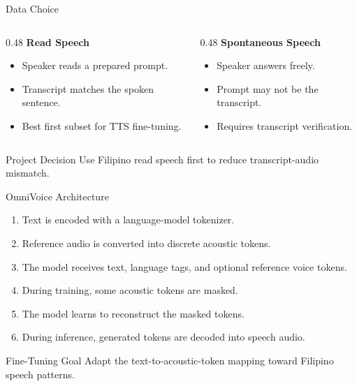 \documentclass[aspectratio=169]{beamer}
\begin{document}
\begin{frame}{Data Choice}
  \begin{columns}[T]
    \begin{column}{0.48\textwidth}
      \textbf{Read Speech}
      \begin{itemize}
        \item Speaker reads a prepared prompt.
        \item Transcript matches the spoken sentence.
        \item Best first subset for TTS fine-tuning.
      \end{itemize}
    \end{column}
    \begin{column}{0.48\textwidth}
      \textbf{Spontaneous Speech}
      \begin{itemize}
        \item Speaker answers freely.
        \item Prompt may not be the transcript.
        \item Requires transcript verification.
      \end{itemize}
    \end{column}
  \end{columns}

  \vspace{0.7em}
  \begin{block}{Project Decision}
    Use Filipino read speech first to reduce transcript-audio mismatch.
  \end{block}
\end{frame}

\begin{frame}{OmniVoice Architecture}
  \begin{enumerate}
    \item Text is encoded with a language-model tokenizer.
    \item Reference audio is converted into discrete acoustic tokens.
    \item The model receives text, language tags, and optional reference voice tokens.
    \item During training, some acoustic tokens are masked.
    \item The model learns to reconstruct the masked tokens.
    \item During inference, generated tokens are decoded into speech audio.
  \end{enumerate}

  \vspace{0.5em}
  \begin{block}{Fine-Tuning Goal}
    Adapt the text-to-acoustic-token mapping toward Filipino speech patterns.
  \end{block}
\end{frame}
\end{document}
